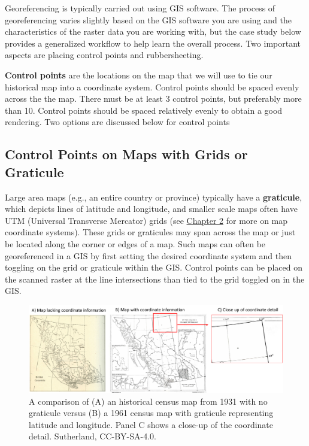 \documentclass[
]{book}
\begin{document}
Georeferencing is typically carried out using GIS software. The process of georeferencing varies slightly based on the GIS software you are using and the characteristics of the raster data you are working with, but the case study below provides a generalized workflow to help learn the overall process. Two important aspects are placing control points and rubbersheeting.

\textbf{Control points} are the locations on the map that we will use to tie our historical map into a coordinate system. Control points should be spaced evenly across the the map. There must be at least 3 control points, but preferably more than 10. Control points should be spaced relatively evenly to obtain a good rendering. Two options are discussed below for control points

\hypertarget{control-points-on-maps-with-grids-or-graticule}{%
\subsection{Control Points on Maps with Grids or Graticule}\label{control-points-on-maps-with-grids-or-graticule}}

Large area maps (e.g., an entire country or province) typically have a \textbf{graticule}, which depicts lines of latitude and longitude, and smaller scale maps often have UTM (Universal Transverse Mercator) grids (see \href{https://www.opengeomatics.ca/mapping-data.html}{Chapter 2} for more on map coordinate systems). These grids or graticules may span across the map or just be located along the corner or edges of a map. Such maps can often be georeferenced in a GIS by first setting the desired coordinate system and then toggling on the grid or graticule within the GIS. Control points can be placed on the scanned raster at the line intersections than tied to the grid toggled on in the GIS.

\begin{figure}
\includegraphics[width=0.75\linewidth]{images/04-control-points} \caption{A comparison of (A) an historical census map from 1931 with no graticule versus (B) a 1961 census map with graticule representing latitude and longitude. Panel C shows a close-up of the coordinate detail. Sutherland, CC-BY-SA-4.0.}\label{fig:4-control-points}
\end{figure}
\end{document}
